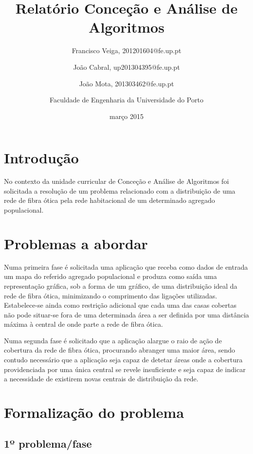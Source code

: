 \documentclass[a4paper,12pt,titlepage]{article}
\begin{document}
\title{Relatório Conceção e Análise de Algoritmos}
\date{março 2015}
\author{Francisco Veiga, 201201604@fe.up.pt
 \and João Cabral, up201304395@fe.up.pt
 \and  João Mota, 201303462@fe.up.pt\linebreak
 \and Faculdade de Engenharia da Universidade do Porto}
%
\maketitle
\tableofcontents
\newpage
\section{Introdução}

No contexto da unidade curricular de Conceção e Análise de Algoritmos foi solicitada a resolução de um problema relacionado com a distribuição de uma rede de fibra ótica pela rede habitacional de um determinado agregado populacional.

\section{Problemas a abordar} 
Numa primeira fase é solicitada uma aplicação que receba como dados de entrada um mapa do referido agregado populacional e produza como saída uma representação gráfica, sob a forma de um gráfico, de uma distribuição ideal da rede de fibra ótica, minimizando o comprimento das ligações utilizadas. Estabelece-se ainda como restrição adicional que cada uma das casas cobertas não pode situar-se fora de uma determinada área a ser definida por uma distância máxima à central de onde parte a rede de fibra ótica.
 
Numa segunda fase é solicitado que a aplicação alargue o raio de ação de cobertura da rede de fibra ótica, procurando abranger uma maior área, sendo contudo necessário que a aplicação seja capaz de detetar áreas onde a cobertura providenciada por uma única central se revele insuficiente e seja capaz de indicar a necessidade de existirem novas centrais de distribuição da rede.

\newpage
\section{Formalização do problema}

\subsection{1º problema/fase}
\end{document}
